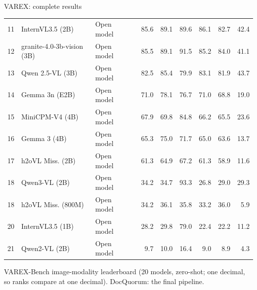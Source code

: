 \documentclass[aspectratio=169,10pt]{beamer}
\newcommand{\src}[1]{\par\vfill{\tiny\color{muted}#1\par}}
\begin{document}
\begin{frame}{VAREX: complete results}
\begin{tabularx}{\textwidth}{@{}rYl@{\hspace{6pt}}lrrrrrr@{}}
11 & InternVL3.5 (2B) & {\color{good}Open model} & \textcolor{good!45}{\rule{1.03cm}{1.05ex}} & 85.6 & 89.1 & 89.6 & 86.1 & 82.7 & 42.4\\
12 & granite-4.0-3b-vision (3B) & {\color{good}Open model} & \textcolor{good!45}{\rule{1.03cm}{1.05ex}} & 85.5 & 89.1 & 91.5 & 85.2 & 84.0 & 41.1\\
13 & Qwen 2.5-VL (3B) & {\color{good}Open model} & \textcolor{good!45}{\rule{0.99cm}{1.05ex}} & 82.5 & 85.4 & 79.9 & 83.1 & 81.9 & 43.7\\
14 & Gemma 3n (E2B) & {\color{good}Open model} & \textcolor{good!45}{\rule{0.85cm}{1.05ex}} & 71.0 & 78.1 & 76.7 & 71.0 & 68.8 & 19.0\\
15 & MiniCPM-V4 (4B) & {\color{good}Open model} & \textcolor{good!45}{\rule{0.81cm}{1.05ex}} & 67.9 & 69.8 & 84.8 & 66.2 & 65.5 & 23.6\\
16 & Gemma 3 (4B) & {\color{good}Open model} & \textcolor{good!45}{\rule{0.78cm}{1.05ex}} & 65.3 & 75.0 & 71.7 & 65.0 & 63.6 & 13.7\\
17 & h2oVL Miss. (2B) & {\color{good}Open model} & \textcolor{good!45}{\rule{0.74cm}{1.05ex}} & 61.3 & 64.9 & 67.2 & 61.3 & 58.9 & 11.6\\
18 & Qwen3-VL (2B) & {\color{good}Open model} & \textcolor{good!45}{\rule{0.41cm}{1.05ex}} & 34.2 & 34.7 & 93.3 & 26.8 & 29.0 & 29.3\\
18 & h2oVL Miss. (800M) & {\color{good}Open model} & \textcolor{good!45}{\rule{0.41cm}{1.05ex}} & 34.2 & 36.1 & 35.8 & 33.2 & 36.0 & 5.9\\
20 & InternVL3.5 (1B) & {\color{good}Open model} & \textcolor{good!45}{\rule{0.34cm}{1.05ex}} & 28.2 & 29.8 & 79.0 & 22.4 & 22.2 & 11.2\\
21 & Qwen2-VL (2B) & {\color{good}Open model} & \textcolor{good!45}{\rule{0.12cm}{1.05ex}} & 9.7 & 10.0 & 16.4 & 9.0 & 8.9 & 4.3\\
\bottomrule\end{tabularx}\endgroup

\src{VAREX-Bench image-modality leaderboard (20 models, zero-shot; one decimal, so ranks compare at one decimal). DocQuorum: the final pipeline.}
\end{frame}
\end{document}
